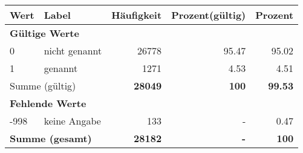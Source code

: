      \begin{longtable}{lXrrr}
     \toprule
     \textbf{Wert} & \textbf{Label} & \textbf{Häufigkeit} & \textbf{Prozent(gültig)} & \textbf{Prozent} \\
     \endhead
     \midrule
     \multicolumn{5}{l}{\textbf{Gültige Werte}}\\

     0 &
     \multicolumn{1}{X}{ nicht genannt   } &


       \num{26778} &
       \num[round-mode=places,round-precision=2]{95.47} &
         \num[round-mode=places,round-precision=2]{95.02} \\

     1 &
     \multicolumn{1}{X}{ genannt   } &


       \num{1271} &
       \num[round-mode=places,round-precision=2]{4.53} &
         \num[round-mode=places,round-precision=2]{4.51} \\
     \midrule
     \multicolumn{2}{l}{Summe (gültig)} &
       \textbf{\num{28049}} &
     \textbf{\num{100}} &
       \textbf{\num[round-mode=places,round-precision=2]{99.53}} \\
     \multicolumn{5}{l}{\textbf{Fehlende Werte}}\\
       -998 &
       keine Angabe &
         \num{133} &
        - &
         \num[round-mode=places,round-precision=2]{0.47} \\
     \midrule
     \multicolumn{2}{l}{\textbf{Summe (gesamt)}} &
          \textbf{\num{28182}} &
        \textbf{-} &
        \textbf{\num{100}} \\
     \bottomrule
     \end{longtable}
     
